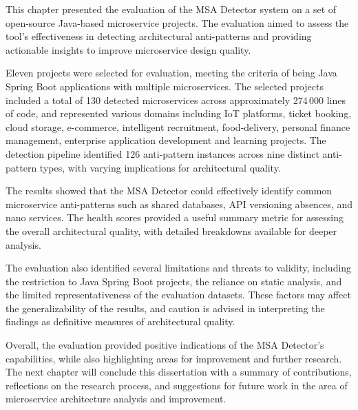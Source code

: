 \par This chapter presented the evaluation of the MSA Detector system on a set of open-source Java-based microservice projects. The evaluation aimed to assess the tool's effectiveness in detecting architectural anti-patterns and providing actionable insights to improve microservice design quality.

\par Eleven projects were selected for evaluation, meeting the criteria of being Java Spring Boot applications with multiple microservices. The selected projects included a total of 130 detected microservices across approximately 274\,000 lines of code, and represented various domains including IoT platforms, ticket booking, cloud storage, e-commerce, intelligent recruitment, food-delivery, personal finance management, enterprise application development and learning projects. The detection pipeline identified 126 anti-pattern instances across nine distinct anti-pattern types, with varying implications for architectural quality.

\par The results showed that the MSA Detector could effectively identify common microservice anti-patterns such as shared databases, API versioning absences, and nano services. The health scores provided a useful summary metric for assessing the overall architectural quality, with detailed breakdowns available for deeper analysis.

\par The evaluation also identified several limitations and threats to validity, including the restriction to Java Spring Boot projects, the reliance on static analysis, and the limited representativeness of the evaluation datasets. These factors may affect the generalizability of the results, and caution is advised in interpreting the findings as definitive measures of architectural quality.

\par Overall, the evaluation provided positive indications of the MSA Detector's capabilities, while also highlighting areas for improvement and further research. The next chapter will conclude this dissertation with a summary of contributions, reflections on the research process, and suggestions for future work in the area of microservice architecture analysis and improvement.
